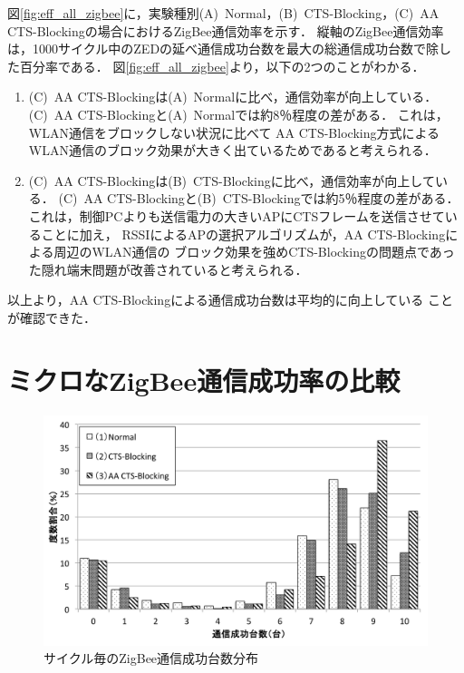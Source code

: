 \documentclass[12pt]{jreport}
\begin{document}
図\ref{fig:eff_all_zigbee}に，実験種別(A)~Normal，(B)~CTS-Blocking，(C)~AA CTS-Blockingの場合におけるZigBee通信効率を示す．
縦軸のZigBee通信効率は，1000サイクル中のZEDの延べ通信成功台数を最大の総通信成功台数で除した百分率である．
図\ref{fig:eff_all_zigbee}より，以下の2つのことがわかる．
\begin{enumerate}
 \item (C)~AA CTS-Blockingは(A)~Normalに比べ，通信効率が向上している．
(C)~AA CTS-Blockingと(A)~Normalでは約8％程度の差がある．
これは，WLAN通信をブロックしない状況に比べて
AA CTS-Blocking方式によるWLAN通信のブロック効果が大きく出ているためであると考えられる．

 \item (C)~AA CTS-Blockingは(B)~CTS-Blockingに比べ，通信効率が向上している．
(C)~AA CTS-Blockingと(B)~CTS-Blockingでは約5％程度の差がある．
これは，制御PCよりも送信電力の大きいAPにCTSフレームを送信させていることに加え，
RSSIによるAPの選択アルゴリズムが，AA CTS-Blockingによる周辺のWLAN通信の
ブロック効果を強めCTS-Blockingの問題点であった隠れ端末問題が改善されていると考えられる．


\end{enumerate}

以上より，AA CTS-Blockingによる通信成功台数は平均的に向上している
ことが確認できた．

\section{ミクロなZigBee通信成功率の比較}
\label{sec:exp_result_part}

\begin{figure}[bt]
 \centering
 \includegraphics[width=\columnwidth]{figure/eff_one_zigbee.pdf}
 \caption{サイクル毎のZigBee通信成功台数分布}
 \label{fig:eff_one_zigbee}
\end{figure}
\end{document}
